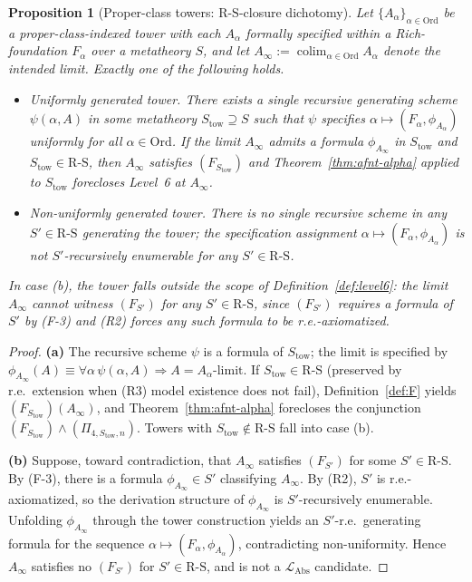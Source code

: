 \documentclass[11pt]{article}
\theoremstyle{plain}
\newtheorem{proposition}[theorem]{Proposition}
\theoremstyle{definition}
\newcommand{\RS}{\mathrm{R\text{-}S}}
\newcommand{\LAbs}{\mathcal{L}_{\mathrm{Abs}}}
\DeclareMathOperator{\colim}{colim}
\begin{document}
\begin{proposition}[Proper-class towers: $\RS$-closure dichotomy]\label{prop:proper-class}
Let $\{A_\alpha\}_{\alpha \in \mathrm{Ord}}$ be a proper-class-indexed tower with each $A_\alpha$ formally specified within a Rich-foundation $F_\alpha$ over a metatheory $S$, and let $A_\infty := \colim_{\alpha \in \mathrm{Ord}} A_\alpha$ denote the intended limit. Exactly one of the following holds.
\begin{itemize}
\item[\textbf{(a)}] \emph{Uniformly generated tower.} There exists a single recursive generating scheme $\psi(\alpha, A)$ in some metatheory $S_{\mathrm{tow}} \supseteq S$ such that $\psi$ specifies $\alpha \mapsto (F_\alpha, \phi_{A_\alpha})$ uniformly for all $\alpha \in \mathrm{Ord}$. If the limit $A_\infty$ admits a formula $\phi_{A_\infty}$ in $S_{\mathrm{tow}}$ and $S_{\mathrm{tow}} \in \RS$, then $A_\infty$ satisfies $(F_{S_{\mathrm{tow}}})$ and Theorem~\ref{thm:afnt-alpha} applied to $S_{\mathrm{tow}}$ forecloses Level~6 at $A_\infty$.
\item[\textbf{(b)}] \emph{Non-uniformly generated tower.} There is no single recursive scheme in any $S' \in \RS$ generating the tower; the specification assignment $\alpha \mapsto (F_\alpha, \phi_{A_\alpha})$ is not $S'$-recursively enumerable for any $S' \in \RS$.
\end{itemize}
In case (b), the tower falls outside the scope of Definition~\ref{def:level6}: the limit $A_\infty$ cannot witness $(F_{S'})$ for any $S' \in \RS$, since $(F_{S'})$ requires a formula of $S'$ by (F-3) and (R2) forces any such formula to be r.e.-axiomatized.
\end{proposition}

\begin{proof}
\textbf{(a)} The recursive scheme $\psi$ is a formula of $S_{\mathrm{tow}}$; the limit is specified by $\phi_{A_\infty}(A) \equiv \forall \alpha\,\psi(\alpha, A) \Rightarrow A = A_\alpha\text{-limit}$. If $S_{\mathrm{tow}} \in \RS$ (preserved by r.e.\ extension when (R3) model existence does not fail), Definition~\ref{def:F} yields $(F_{S_{\mathrm{tow}}})(A_\infty)$, and Theorem~\ref{thm:afnt-alpha} forecloses the conjunction $(F_{S_{\mathrm{tow}}}) \wedge (\Pi_{4, S_{\mathrm{tow}}, n})$. Towers with $S_{\mathrm{tow}} \notin \RS$ fall into case (b).

\textbf{(b)} Suppose, toward contradiction, that $A_\infty$ satisfies $(F_{S'})$ for some $S' \in \RS$. By (F-3), there is a formula $\phi_{A_\infty} \in S'$ classifying $A_\infty$. By (R2), $S'$ is r.e.-axiomatized, so the derivation structure of $\phi_{A_\infty}$ is $S'$-recursively enumerable. Unfolding $\phi_{A_\infty}$ through the tower construction yields an $S'$-r.e.\ generating formula for the sequence $\alpha \mapsto (F_\alpha, \phi_{A_\alpha})$, contradicting non-uniformity. Hence $A_\infty$ satisfies no $(F_{S'})$ for $S' \in \RS$, and is not a $\LAbs$ candidate.
\end{proof}
\end{document}

